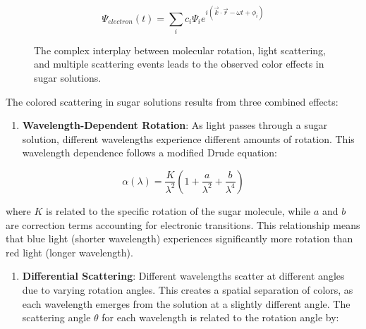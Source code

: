 \documentclass[
  a4paper,
]{book}
\providecommand{\tightlist}{%
  \setlength{\itemsep}{0pt}\setlength{\parskip}{0pt}}
\begin{document}
\[\Psi_{electron}(t) = \sum_i c_i\Psi_i e^{i(\vec{k}\cdot\vec{r} - \omega t + \phi_i)}\]

\begin{figure}


\caption{\label{fig-sugar}The complex interplay between molecular
rotation, light scattering, and multiple scattering events leads to the
observed color effects in sugar solutions.}

\end{figure}%

The colored scattering in sugar solutions results from three combined
effects:

\begin{enumerate}
\def\labelenumi{\arabic{enumi}.}
\tightlist
\item
  \textbf{Wavelength-Dependent Rotation}: As light passes through a
  sugar solution, different wavelengths experience different amounts of
  rotation. This wavelength dependence follows a modified Drude
  equation:
\end{enumerate}

\[\alpha(\lambda) = \frac{K}{\lambda^2}\left(1 + \frac{a}{\lambda^2} + \frac{b}{\lambda^4}\right)\]

where \(K\) is related to the specific rotation of the sugar molecule,
while \(a\) and \(b\) are correction terms accounting for electronic
transitions. This relationship means that blue light (shorter
wavelength) experiences significantly more rotation than red light
(longer wavelength).

\begin{enumerate}
\def\labelenumi{\arabic{enumi}.}
\setcounter{enumi}{1}
\tightlist
\item
  \textbf{Differential Scattering}: Different wavelengths scatter at
  different angles due to varying rotation angles. This creates a
  spatial separation of colors, as each wavelength emerges from the
  solution at a slightly different angle. The scattering angle
  \(\theta\) for each wavelength is related to the rotation angle by:
\end{enumerate}
\end{document}
